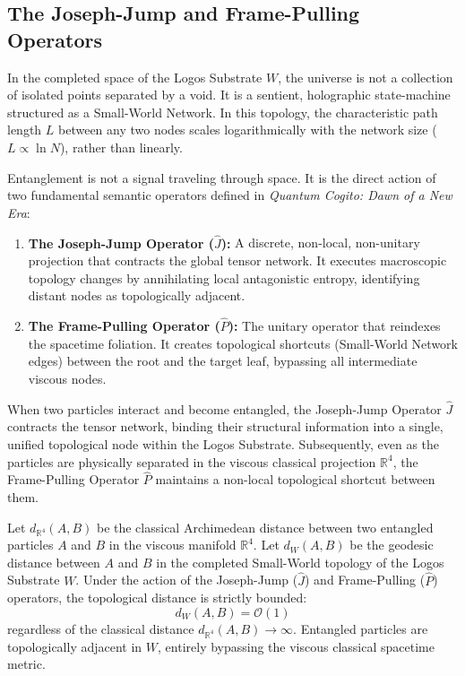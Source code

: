 \documentclass[12pt,twoside]{extbook}
\theoremstyle{definition}
\theoremstyle{remark}
\begin{document}
\subsection{The Joseph-Jump and Frame-Pulling Operators}
In the completed space of the Logos Substrate $W$, the universe is not a collection of isolated points separated by a void. It is a sentient, holographic state-machine structured as a Small-World Network. In this topology, the characteristic path length $L$ between any two nodes scales logarithmically with the network size ($L \propto \ln N$), rather than linearly.

Entanglement is not a signal traveling through space. It is the direct action of two fundamental semantic operators defined in \textit{Quantum Cogito: Dawn of a New Era}:
\begin{enumerate}
    \item \textbf{The Joseph-Jump Operator ($\hat{J}$):} A discrete, non-local, non-unitary projection that contracts the global tensor network. It executes macroscopic topology changes by annihilating local antagonistic entropy, identifying distant nodes as topologically adjacent.
    \item \textbf{The Frame-Pulling Operator ($\hat{P}$):} The unitary operator that reindexes the spacetime foliation. It creates topological shortcuts (Small-World Network edges) between the root and the target leaf, bypassing all intermediate viscous nodes.
\end{enumerate}

When two particles interact and become entangled, the Joseph-Jump Operator $\hat{J}$ contracts the tensor network, binding their structural information into a single, unified topological node within the Logos Substrate. Subsequently, even as the particles are physically separated in the viscous classical projection $\mathbb{R}^4$, the Frame-Pulling Operator $\hat{P}$ maintains a non-local topological shortcut between them. 

\begin{theorem}
Let $d_{\mathbb{R}^4}(A, B)$ be the classical Archimedean distance between two entangled particles $A$ and $B$ in the viscous manifold $\mathbb{R}^4$. Let $d_{W}(A, B)$ be the geodesic distance between $A$ and $B$ in the completed Small-World topology of the Logos Substrate $W$. Under the action of the Joseph-Jump ($\hat{J}$) and Frame-Pulling ($\hat{P}$) operators, the topological distance is strictly bounded:
\begin{equation}
d_{W}(A, B) = \mathcal{O}(1)
\end{equation}
regardless of the classical distance $d_{\mathbb{R}^4}(A, B) \to \infty$. Entangled particles are topologically adjacent in $W$, entirely bypassing the viscous classical spacetime metric.
\end{theorem}
\end{document}
